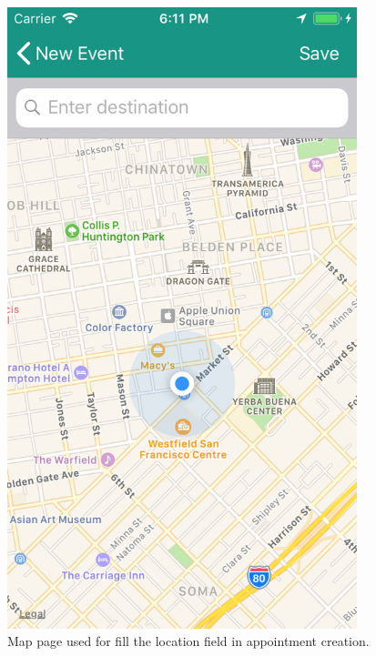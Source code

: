 \begin{figure}
	\centering
	\includegraphics[width=4in]{./screenshots/iOSMap.png}
	\caption{Map page used for fill the location field in appointment creation.}
	\label{fig:isomap}
\end{figure}

